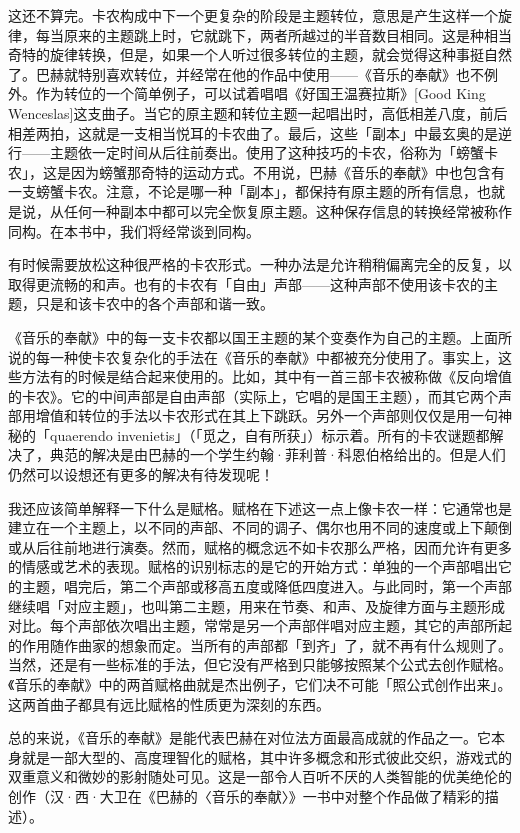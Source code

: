 \documentclass[
  12pt,
  twoside,
  openright,
  oldfontcommands,
]{memoir}
\begin{document}
这还不算完。卡农构成中下一个更复杂的阶段是主题转位，意思是产生这样一个旋律，每当原来的主题跳上时，它就跳下，两者所越过的半音数目相同。这是种相当奇特的旋律转换，但是，如果一个人听过很多转位的主题，就会觉得这种事挺自然了。巴赫就特别喜欢转位，并经常在他的作品中使用------《音乐的奉献》也不例外。作为转位的一个简单例子，可以试着唱唱《好国王温赛拉斯》{[}Good
King
Wenceslas{]}这支曲子。当它的原主题和转位主题一起唱出时，高低相差八度，前后相差两拍，这就是一支相当悦耳的卡农曲了。最后，这些「副本」中最玄奥的是逆行------主题依一定时间从后往前奏出。使用了这种技巧的卡农，俗称为「螃蟹卡农」，这是因为螃蟹那奇特的运动方式。不用说，巴赫《音乐的奉献》中也包含有一支螃蟹卡农。注意，不论是哪一种「副本」，都保持有原主题的所有信息，也就是说，从任何一种副本中都可以完全恢复原主题。这种保存信息的转换经常被称作同构。在本书中，我们将经常谈到同构。

有时候需要放松这种很严格的卡农形式。一种办法是允许稍稍偏离完全的反复，以取得更流畅的和声。也有的卡农有「自由」声部------这种声部不使用该卡农的主题，只是和该卡农中的各个声部和谐一致。

《音乐的奉献》中的每一支卡农都以国王主题的某个变奏作为自己的主题。上面所说的每一种使卡农复杂化的手法在《音乐的奉献》中都被充分使用了。事实上，这些方法有的时候是结合起来使用的。比如，其中有一首三部卡农被称做《反向增值的卡农》。它的中间声部是自由声部（实际上，它唱的是国王主题），而其它两个声部用增值和转位的手法以卡农形式在其上下跳跃。另外一个声部则仅仅是用一句神秘的「quaerendo
invenietis」（「觅之，自有所获」）标示着。所有的卡农谜题都解决了，典范的解决是由巴赫的一个学生约翰·菲利普·科恩伯格给出的。但是人们仍然可以设想还有更多的解决有待发现呢！

我还应该简单解释一下什么是赋格。赋格在下述这一点上像卡农一样：它通常也是建立在一个主题上，以不同的声部、不同的调子、偶尔也用不同的速度或上下颠倒或从后往前地进行演奏。然而，赋格的概念远不如卡农那么严格，因而允许有更多的情感或艺术的表现。赋格的识别标志的是它的开始方式：单独的一个声部唱出它的主题，唱完后，第二个声部或移高五度或降低四度进入。与此同时，第一个声部继续唱「对应主题」，也叫第二主题，用来在节奏、和声、及旋律方面与主题形成对比。每个声部依次唱出主题，常常是另一个声部伴唱对应主题，其它的声部所起的作用随作曲家的想象而定。当所有的声部都「到齐」了，就不再有什么规则了。当然，还是有一些标准的手法，但它没有严格到只能够按照某个公式去创作赋格。《音乐的奉献》中的两首赋格曲就是杰出例子，它们决不可能「照公式创作出来」。这两首曲子都具有远比赋格的性质更为深刻的东西。

总的来说，《音乐的奉献》是能代表巴赫在对位法方面最高成就的作品之一。它本身就是一部大型的、高度理智化的赋格，其中许多概念和形式彼此交织，游戏式的双重意义和微妙的影射随处可见。这是一部令人百听不厌的人类智能的优美绝伦的创作（汉·西·大卫在《巴赫的〈音乐的奉献〉》一书中对整个作品做了精彩的描述）。
\end{document}
